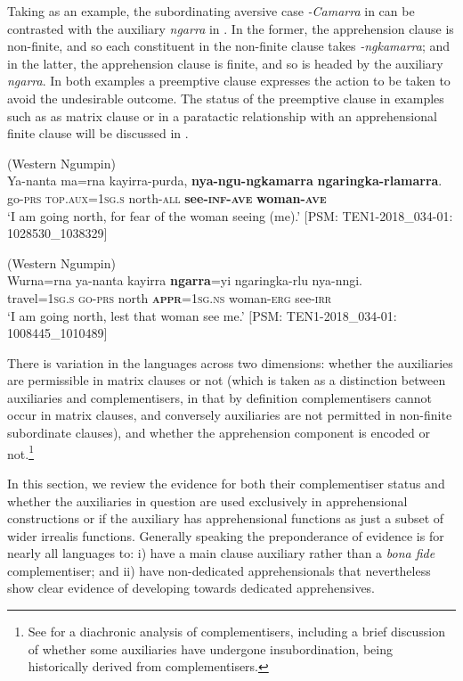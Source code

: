 \documentclass[output=paper,colorlinks,citecolor=brown]{langscibook}
\begin{document}
Taking  as an example, the subordinating aversive case \textit{-Camarra} in  can be contrasted with the auxiliary \textit{ngarra} in . In the former, the apprehension clause is non-finite, and so each constituent in the non-finite clause takes \mbox{\textit{-ngkamarra}}; and in the latter, the apprehension clause is finite, and so is headed by the auxiliary \textit{ngarra}. In both examples a preemptive clause expresses the action to be taken to avoid the undesirable outcome. The status of the preemptive clause in examples such as  as matrix clause or in a paratactic relationship with an apprehensional finite clause will be discussed in .

\newpage
\ea 
\textnormal{ (Western Ngumpin)} \\
\gll Ya-nanta ma=rna kayirra-purda, \textbf{nya-ngu-ngkamarra} \textbf{ngaringka-rlamarra}. \\
go-\textsc{prs} \textsc{top.aux=1sg.s} north-\textsc{all} \textbf{see-\textsc{inf-ave}} \textbf{woman-\textsc{ave}} \\
\glt `I am going north, for fear of the woman seeing (me).' $[$PSM: TEN1-2018\_034-01: 1028530\_1038329$]$
\label{ex:bro43}
\z

\ea 
\textnormal{ (Western Ngumpin)} \\
\gll Wurna=rna ya-nanta kayirra \textbf{ngarra}=yi ngaringka-rlu nya-nngi. \\
travel=\textsc{1sg.s} \textsc{go-prs} north \textsc{\textbf{appr}=1sg.ns} woman-\textsc{erg} see-\textsc{irr} \\
\glt `I am going north, lest that woman see me.' $[$PSM: TEN1-2018\_034-01: 1008445\_1010489$]$
\label{ex:bro44}
\z

 There is variation in the languages across two dimensions: whether the auxiliaries are permissible in matrix clauses or not (which is taken as a distinction between auxiliaries and complementisers, in that by definition complementisers cannot occur in matrix clauses, and conversely auxiliaries are not permitted in non-finite subordinate clauses), and whether the apprehension component is encoded or not.\footnote{See \citet{mcconvell_grammaticalization_2006} for a diachronic analysis of  complementisers, including a brief discussion of whether some auxiliaries have undergone insubordination, being historically derived from complementisers.}

In this section, we review the evidence for both their complementiser status and whether the auxiliaries in question are used exclusively in apprehensional constructions or if the auxiliary has apprehensional functions as just a subset of wider irrealis functions. Generally speaking the preponderance of evidence is for nearly all  languages to: i) have a main clause auxiliary rather than a \textit{bona fide} complementiser; and ii) have non-dedicated apprehensionals that nevertheless show clear evidence of developing towards dedicated apprehensives. 
\end{document}
